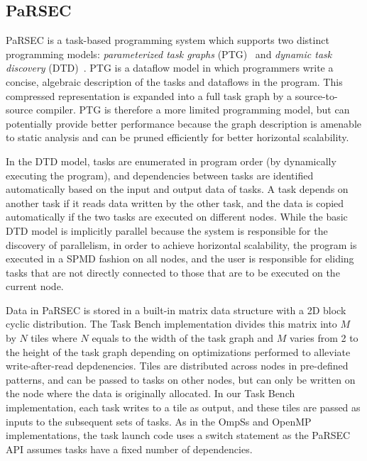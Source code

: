 
\subsection{PaRSEC}

PaRSEC is a task-based programming system which supports two distinct
programming models: \emph{parameterized task graphs}
(PTG)~\cite{PARSEC13} and \emph{dynamic task discovery}
(DTD)~\cite{PARSEC_DTD}.  PTG is a dataflow model in which programmers
write a concise, algebraic description of the tasks and dataflows in
the program. This compressed representation is expanded into a full
task graph by a source-to-source compiler. PTG is therefore a more
limited programming model, but can potentially provide better
performance because the graph description is amenable to static
analysis and can be pruned efficiently for better horizontal
scalability.

In the DTD model, tasks are enumerated in program order (by
dynamically executing the program), and dependencies between tasks are
identified automatically based on the input and output data of tasks. 
A task depends on another task if it reads data written by the other task,
and the data is copied automatically if the two tasks are executed on
different nodes. While the basic DTD model is implicitly parallel
because the system is responsible for the discovery of parallelism, in
order to achieve horizontal scalability, the program is executed in a
SPMD fashion on all nodes, and the user is responsible for eliding
tasks that are not directly connected to those that are to be executed
on the current node.

Data in PaRSEC is stored in a built-in matrix data structure with a 2D block cyclic distribution. 
The Task Bench implementation divides this matrix into $M$ by $N$ tiles where $N$ equals to the width of
the task graph and $M$ varies from 2 to the height of the task graph depending
on optimizations performed to alleviate write-after-read depdenencies. 
Tiles are distributed across nodes in pre-defined patterns, 
and can be passed to tasks on other nodes, but
can only be written on the node where the data is originally
allocated. In our Task Bench implementation, each task writes to a
tile as output, and these tiles are passed as inputs to the
subsequent sets of tasks. As in the OmpSs and OpenMP implementations,
the task launch code uses a switch statement as the PaRSEC API assumes
tasks have a fixed number of dependencies.

